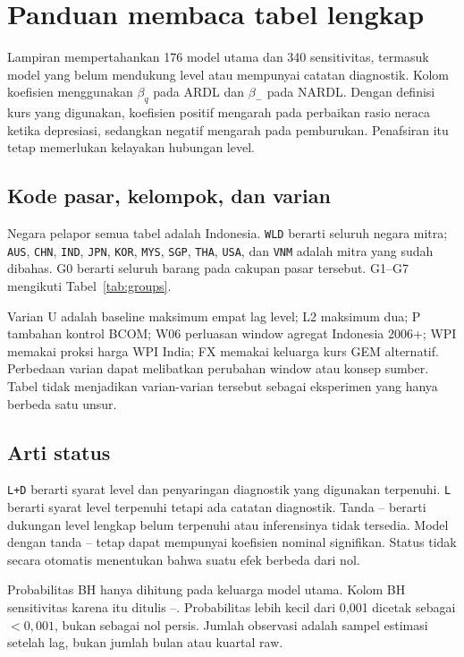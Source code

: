 \section{Panduan membaca tabel lengkap}\label{app:read}
Lampiran mempertahankan 176 model utama dan 340 sensitivitas, termasuk model yang belum mendukung level atau mempunyai catatan diagnostik. Kolom koefisien menggunakan $\beta_q$ pada ARDL dan $\beta_-$ pada NARDL. Dengan definisi kurs yang digunakan, koefisien positif mengarah pada perbaikan rasio neraca ketika depresiasi, sedangkan negatif mengarah pada pemburukan. Penafsiran itu tetap memerlukan kelayakan hubungan level.

\subsection{Kode pasar, kelompok, dan varian}
Negara pelapor semua tabel adalah Indonesia. \texttt{WLD} berarti seluruh negara mitra; \texttt{AUS}, \texttt{CHN}, \texttt{IND}, \texttt{JPN}, \texttt{KOR}, \texttt{MYS}, \texttt{SGP}, \texttt{THA}, \texttt{USA}, dan \texttt{VNM} adalah mitra yang sudah dibahas. G0 berarti seluruh barang pada cakupan pasar tersebut. G1--G7 mengikuti Tabel~\ref{tab:groups}.

Varian U adalah baseline maksimum empat lag level; L2 maksimum dua; P tambahan kontrol BCOM; W06 perluasan window agregat Indonesia 2006+; WPI memakai proksi harga WPI India; FX memakai keluarga kurs GEM alternatif. Perbedaan varian dapat melibatkan perubahan window atau konsep sumber. Tabel tidak menjadikan varian-varian tersebut sebagai eksperimen yang hanya berbeda satu unsur.

\subsection{Arti status}
\texttt{L+D} berarti syarat level dan penyaringan diagnostik yang digunakan terpenuhi. \texttt{L} berarti syarat level terpenuhi tetapi ada catatan diagnostik. Tanda -- berarti dukungan level lengkap belum terpenuhi atau inferensinya tidak tersedia. Model dengan tanda -- tetap dapat mempunyai koefisien nominal signifikan. Status tidak secara otomatis menentukan bahwa suatu efek berbeda dari nol.

Probabilitas BH hanya dihitung pada keluarga model utama. Kolom BH sensitivitas karena itu ditulis --. Probabilitas lebih kecil dari 0,001 dicetak sebagai $<0{,}001$, bukan sebagai nol persis. Jumlah observasi adalah sampel estimasi setelah lag, bukan jumlah bulan atau kuartal raw.

